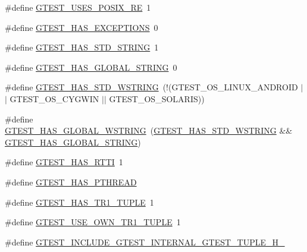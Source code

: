 \begin{DoxyCompactItemize}
\item 
\#define \hyperlink{fused-src_2gtest_2gtest_8h_acecef794eeb09598cd47da764271cb18}{G\-T\-E\-S\-T\-\_\-\-U\-S\-E\-S\-\_\-\-P\-O\-S\-I\-X\-\_\-\-R\-E}~1
\item 
\#define \hyperlink{fused-src_2gtest_2gtest_8h_aedcf220690e6589d0fc2bd3db768ea66}{G\-T\-E\-S\-T\-\_\-\-H\-A\-S\-\_\-\-E\-X\-C\-E\-P\-T\-I\-O\-N\-S}~0
\item 
\#define \hyperlink{fused-src_2gtest_2gtest_8h_adba1121430c11cee8ba0c74e8cf6aa40}{G\-T\-E\-S\-T\-\_\-\-H\-A\-S\-\_\-\-S\-T\-D\-\_\-\-S\-T\-R\-I\-N\-G}~1
\item 
\#define \hyperlink{fused-src_2gtest_2gtest_8h_a6ab57c4a17233dd4ed30c2926bb99cc5}{G\-T\-E\-S\-T\-\_\-\-H\-A\-S\-\_\-\-G\-L\-O\-B\-A\-L\-\_\-\-S\-T\-R\-I\-N\-G}~0
\item 
\#define \hyperlink{fused-src_2gtest_2gtest_8h_a6e087748d8bbd2ca57c487b6ad268670}{G\-T\-E\-S\-T\-\_\-\-H\-A\-S\-\_\-\-S\-T\-D\-\_\-\-W\-S\-T\-R\-I\-N\-G}~(!(G\-T\-E\-S\-T\-\_\-\-O\-S\-\_\-\-L\-I\-N\-U\-X\-\_\-\-A\-N\-D\-R\-O\-I\-D $\vert$$\vert$ G\-T\-E\-S\-T\-\_\-\-O\-S\-\_\-\-C\-Y\-G\-W\-I\-N $\vert$$\vert$ G\-T\-E\-S\-T\-\_\-\-O\-S\-\_\-\-S\-O\-L\-A\-R\-I\-S))
\item 
\#define \hyperlink{fused-src_2gtest_2gtest_8h_afca9ecaf5846561187a15b75013aa85b}{G\-T\-E\-S\-T\-\_\-\-H\-A\-S\-\_\-\-G\-L\-O\-B\-A\-L\-\_\-\-W\-S\-T\-R\-I\-N\-G}~(\hyperlink{gtest-port_8h_a6e087748d8bbd2ca57c487b6ad268670}{G\-T\-E\-S\-T\-\_\-\-H\-A\-S\-\_\-\-S\-T\-D\-\_\-\-W\-S\-T\-R\-I\-N\-G} \&\& \hyperlink{gtest-port_8h_a6ab57c4a17233dd4ed30c2926bb99cc5}{G\-T\-E\-S\-T\-\_\-\-H\-A\-S\-\_\-\-G\-L\-O\-B\-A\-L\-\_\-\-S\-T\-R\-I\-N\-G})
\item 
\#define \hyperlink{fused-src_2gtest_2gtest_8h_a9ba781217167f905bff2f1c410a97930}{G\-T\-E\-S\-T\-\_\-\-H\-A\-S\-\_\-\-R\-T\-T\-I}~1
\item 
\#define \hyperlink{fused-src_2gtest_2gtest_8h_a3341397e1952de0b9cd88762d4d3ae4b}{G\-T\-E\-S\-T\-\_\-\-H\-A\-S\-\_\-\-P\-T\-H\-R\-E\-A\-D}
\item 
\#define \hyperlink{fused-src_2gtest_2gtest_8h_a6de49dd4cbae1db15dc6edca3b179d1b}{G\-T\-E\-S\-T\-\_\-\-H\-A\-S\-\_\-\-T\-R1\-\_\-\-T\-U\-P\-L\-E}~1
\item 
\#define \hyperlink{fused-src_2gtest_2gtest_8h_afa144e5f5d039db0df873e7ad48c1fda}{G\-T\-E\-S\-T\-\_\-\-U\-S\-E\-\_\-\-O\-W\-N\-\_\-\-T\-R1\-\_\-\-T\-U\-P\-L\-E}~1
\item 
\#define \hyperlink{fused-src_2gtest_2gtest_8h_a3ae8480ec6608725dc397ccb312105b0}{G\-T\-E\-S\-T\-\_\-\-I\-N\-C\-L\-U\-D\-E\-\_\-\-G\-T\-E\-S\-T\-\_\-\-I\-N\-T\-E\-R\-N\-A\-L\-\_\-\-G\-T\-E\-S\-T\-\_\-\-T\-U\-P\-L\-E\-\_\-\-H\-\_\-}

\end{DoxyCompactItemize}

